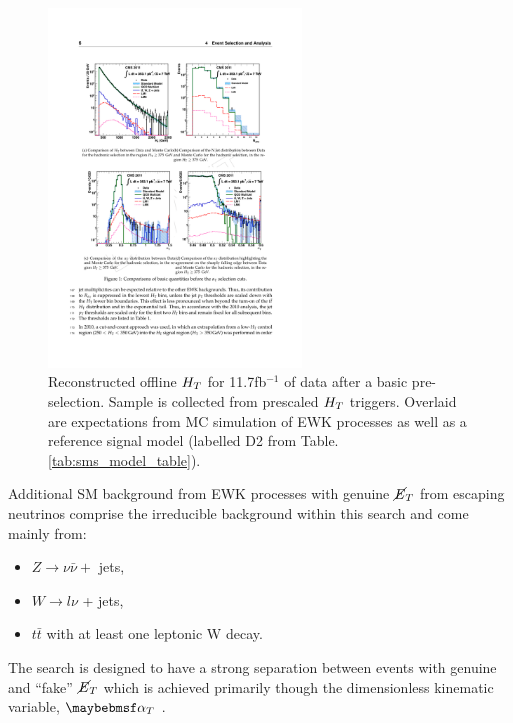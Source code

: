 \begin{figure}[!h]

\centering
\includegraphics[width=0.60\textwidth]{plots/nocuts_htdistribution.pdf}
\caption[Reconstructed offline $\theht$ for 11.7fb$^{-1}$ of data after a basic pre-selection.]{Reconstructed offline $\theht$ for 11.7fb$^{-1}$ of data after a basic pre-selection. Sample is collected from prescaled $\theht$ triggers. Overlaid are expectations from MC simulation of \ac{EWK} processes as well as a reference signal model (labelled D2 from Table.\ref{tab:sms_model_table}).}  
\label{fig:htqcdbackground}
\end{figure}

Additional \ac{SM} background from \ac{EWK} processes with genuine $\cancel{E}_{T}$ from escaping neutrinos comprise the irreducible background within this search and come mainly from:

\begin{itemize}
\item $Z \rightarrow \nu\bar{\nu} +$ jets,
\item $W \rightarrow l\nu$ + jets,
\item $t\bar{t}$ with at least one leptonic W decay.
\end{itemize}

The search is designed to have a strong separation between events with genuine and ``fake'' $\cancel{E}_{T}$ which is achieved primarily though the dimensionless kinematic variable, $\alphat$ \cite{PhysRevLett.101.221803}\cite{CMS:2008vya}.

